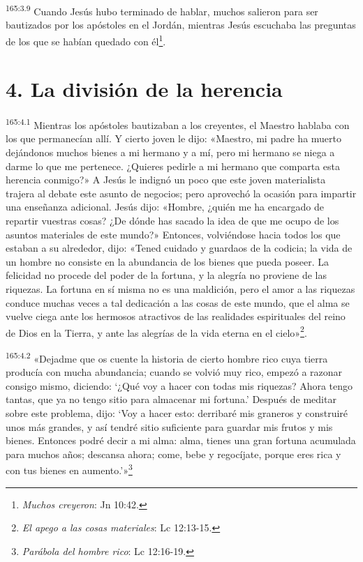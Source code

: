 \par
\textsuperscript{165:3.9} Cuando Jesús hubo terminado de hablar, muchos salieron para ser bautizados por los apóstoles en el Jordán, mientras Jesús escuchaba las preguntas de los que se habían quedado con él\footnote{\textit{Muchos creyeron}: Jn 10:42.}.

\section*{4. La división de la herencia}
\par
\textsuperscript{165:4.1} Mientras los apóstoles bautizaban a los creyentes, el Maestro hablaba con los que permanecían allí. Y cierto joven le dijo: «Maestro, mi padre ha muerto dejándonos muchos bienes a mi hermano y a mí, pero mi hermano se niega a darme lo que me pertenece. ¿Quieres pedirle a mi hermano que comparta esta herencia conmigo?» A Jesús le indignó un poco que este joven materialista trajera al debate este asunto de negocios; pero aprovechó la ocasión para impartir una enseñanza adicional. Jesús dijo: «Hombre, ¿quién me ha encargado de repartir vuestras cosas? ¿De dónde has sacado la idea de que me ocupo de los asuntos materiales de este mundo?» Entonces, volviéndose hacia todos los que estaban a su alrededor, dijo: «Tened cuidado y guardaos de la codicia; la vida de un hombre no consiste en la abundancia de los bienes que pueda poseer. La felicidad no procede del poder de la fortuna, y la alegría no proviene de las riquezas. La fortuna en sí misma no es una maldición, pero el amor a las riquezas conduce muchas veces a tal dedicación a las cosas de este mundo, que el alma se vuelve ciega ante los hermosos atractivos de las realidades espirituales del reino de Dios en la Tierra, y ante las alegrías de la vida eterna en el cielo»\footnote{\textit{El apego a las cosas materiales}: Lc 12:13-15.}.

\par
\textsuperscript{165:4.2} «Dejadme que os cuente la historia de cierto hombre rico cuya tierra producía con mucha abundancia; cuando se volvió muy rico, empezó a razonar consigo mismo, diciendo: `¿Qué voy a hacer con todas mis riquezas? Ahora tengo tantas, que ya no tengo sitio para almacenar mi fortuna.' Después de meditar sobre este problema, dijo: `Voy a hacer esto: derribaré mis graneros y construiré unos más grandes, y así tendré sitio suficiente para guardar mis frutos y mis bienes. Entonces podré decir a mi alma: alma, tienes una gran fortuna acumulada para muchos años; descansa ahora; come, bebe y regocíjate, porque eres rica y con tus bienes en aumento.'»\footnote{\textit{Parábola del hombre rico}: Lc 12:16-19.}

